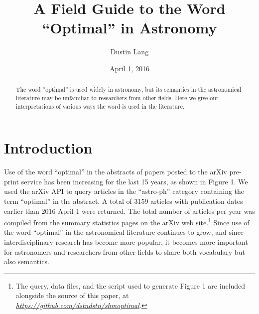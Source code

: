 \documentclass[12pt, preprint]{aastex}
\newcommand{\niceurl}[1]{\href{#1}{\textsl{#1}}}
\begin{document}
\title{A Field Guide to the Word ``Optimal'' in Astronomy}

\author{%
Dustin Lang%
}
\date{\centering April 1, 2016}

\begin{abstract}
The word ``optimal'' is used widely in astronomy, but its semantics
in the astronomical literature
may be unfamiliar to researchers from other fields.  Here we give
our interpretations of various ways the word is used in the literature.
\end{abstract}


\section{Introduction}

Use of the word ``optimal'' in the abstracts of papers posted to the
arXiv pre-print service has been increasing for the last 15 years, as
shown in Figure 1.  We used the arXiv API to query articles in the
``astro-ph'' category containing the term ``optimal'' in the abstract.
A total of 3159 articles with publication dates earlier than 2016
April 1 were returned.  The total number of articles per year was
compiled from the summary statistics pages on the arXiv web site.\footnote{%
  The query, data files, and the script used to generate Figure 1 are included
  alongside the source of this paper, at \niceurl{https://github.com/dstndstn/shmoptimal}.}
Since use of the word ``optimal'' in the astronomical literature continues
to grow, and since interdisciplinary research has become more popular,
it becomes more important for astronomers and researchers from other fields
to share both vocabulary but also semantics.
\end{document}
